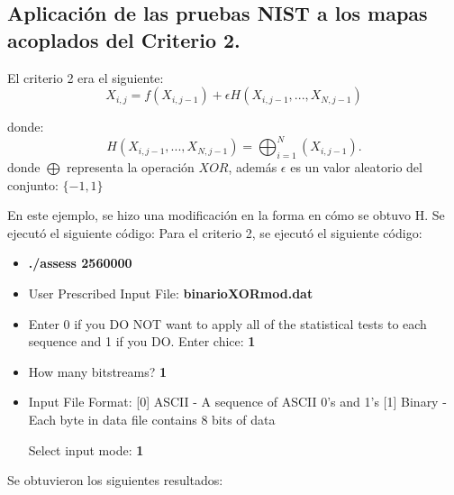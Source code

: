 \documentclass[12pt,3p]{elsarticle}
\begin{document}
\subsection{Aplicación de las pruebas NIST a los mapas acoplados del Criterio 2.}

El criterio 2 era el siguiente:
\begin{equation}
X_{i,j}= f(X_{i,j-1})+ \epsilon  H(X_{i,j-1},...,X_{N,j-1})
\end{equation}

donde:
\begin{equation}
H(X_{i,j-1},...,X_{N,j-1}) = \bigoplus _{i=1}^{N}(X_{i,j-1}).
\end{equation}
donde $\bigoplus$ representa la operación $XOR$, además $\epsilon$ es un valor aleatorio del conjunto: ${\{-1, 1 \}}$

En este ejemplo, se hizo una modificación en la forma en cómo se obtuvo H. Se ejecutó el siguiente código:
Para el criterio 2, se ejecutó el siguiente código:

\begin{itemize}
\item \textbf{./assess 2560000}
\item User Prescribed Input File: \textbf{binarioXORmod.dat}
\item    Enter 0 if you DO NOT want to apply all of the
         statistical tests to each sequence and 1 if you DO. Enter chice: \textbf{1}
                  
\item  How many bitstreams? \textbf{1}

\item Input File Format:
    [0] ASCII - A sequence of ASCII 0's and 1's
    [1] Binary - Each byte in data file contains 8 bits of data

   Select input mode:  \textbf{1}
\end{itemize}


Se obtuvieron los siguientes resultados:
\end{document}
